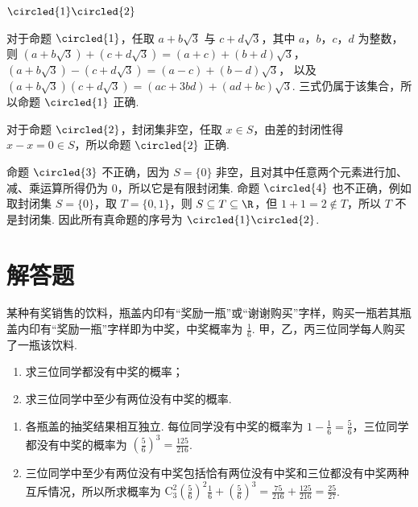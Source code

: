 \begin{answer}
\(\circled{1}\circled{2}\)
\end{answer}

\begin{solution}
对于命题 \(\circled{1}\)，任取 \(a+b\sqrt3\) 与 \(c+d\sqrt3\)，其中 \(a\)，\(b\)，\(c\)，\(d\) 为整数，则
\((a+b\sqrt3)+(c+d\sqrt3)=(a+c)+(b+d)\sqrt3\)，
\((a+b\sqrt3)-(c+d\sqrt3)=(a-c)+(b-d)\sqrt3\)，
以及 \((a+b\sqrt3)(c+d\sqrt3)=(ac+3bd)+(ad+bc)\sqrt3\). 三式仍属于该集合，所以命题 \(\circled{1}\) 正确.

对于命题 \(\circled{2}\)，封闭集非空，任取 \(x\in S\)，由差的封闭性得 \(x-x=0\in S\)，所以命题 \(\circled{2}\) 正确.

命题 \(\circled{3}\) 不正确，因为 \(S=\{0\}\) 非空，且对其中任意两个元素进行加、减、乘运算所得仍为 \(0\)，所以它是有限封闭集. 命题 \(\circled{4}\) 也不正确，例如取封闭集 \(S=\{0\}\)，取 \(T=\{0,1\}\)，则 \(S\subseteq T\subseteq\R\)，但 \(1+1=2\notin T\)，所以 \(T\) 不是封闭集. 因此所有真命题的序号为 \(\circled{1}\circled{2}\).
\end{solution}

\section{解答题}

\begin{problem}
某种有奖销售的饮料，瓶盖内印有“奖励一瓶”或“谢谢购买”字样，购买一瓶若其瓶盖内印有“奖励一瓶”字样即为中奖，中奖概率为 \(\frac{1}{6}\). 甲，乙，丙三位同学每人购买了一瓶该饮料.

\begin{enumerate}
\item 求三位同学都没有中奖的概率；
\item 求三位同学中至少有两位没有中奖的概率.
\end{enumerate}
\end{problem}

\begin{solution}
\begin{enumerate}
\item 各瓶盖的抽奖结果相互独立. 每位同学没有中奖的概率为 \(1-\frac16=\frac56\)，三位同学都没有中奖的概率为 \(\left(\frac56\right)^3=\frac{125}{216}\).
\item 三位同学中至少有两位没有中奖包括恰有两位没有中奖和三位都没有中奖两种互斥情况，所以所求概率为
\( \mathrm C_3^2\left(\frac56\right)^2\frac16+\left(\frac56\right)^3=\frac{75}{216}+\frac{125}{216}=\frac{25}{27}\).
\end{enumerate}
\end{solution}

